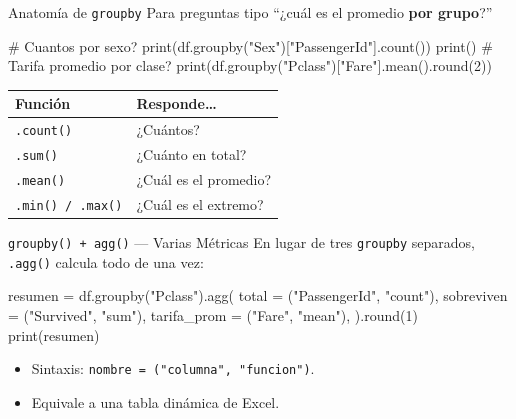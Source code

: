 \documentclass[aspectratio=169, 11pt]{beamer}
\begin{document}
\begin{frame}[fragile,shrink=28]{Anatomía de \texttt{groupby}}
  \vspace{-6pt}
  {\footnotesize
    Para preguntas tipo ``¿cuál es el promedio \textbf{por grupo}?''}

  \vspace{4pt}
  \begin{pyblock}
# Cuantos por sexo?
print(df.groupby("Sex")["PassengerId"].count())
print()
# Tarifa promedio por clase?
print(df.groupby("Pclass")["Fare"].mean().round(2))
  \end{pyblock}

  \vspace{4pt}
  {\scriptsize
  \begin{tabular}{@{}ll@{}}
    \toprule
    \textbf{Función} & \textbf{Responde\ldots} \\
    \midrule
    \texttt{.count()} & ¿Cuántos? \\
    \texttt{.sum()} & ¿Cuánto en total? \\
    \texttt{.mean()} & ¿Cuál es el promedio? \\
    \texttt{.min() / .max()} & ¿Cuál es el extremo? \\
    \bottomrule
  \end{tabular}
  }
\end{frame}

\begin{frame}[fragile,shrink=28]{\texttt{groupby() + agg()} --- Varias Métricas}
  \vspace{-6pt}
  {\footnotesize
    En lugar de tres \texttt{groupby} separados,
    \texttt{.agg()} calcula todo de una vez:}

  \vspace{4pt}
  \begin{pyblock}
resumen = df.groupby("Pclass").agg(
    total       = ("PassengerId", "count"),
    sobreviven  = ("Survived",    "sum"),
    tarifa_prom = ("Fare",        "mean"),
).round(1)
print(resumen)
  \end{pyblock}

  \vspace{4pt}
  {\scriptsize\color{textMuted}
  \begin{itemize}\setlength{\itemsep}{3pt}
    \item[{\color{arcaRed}\scriptsize\faArrowRight}]
      Sintaxis: \texttt{nombre = ("columna", "funcion")}.
    \item[{\color{arcaRed}\scriptsize\faLightbulb}]
      Equivale a una tabla dinámica de Excel.
  \end{itemize}
  }
\end{frame}
\end{document}

